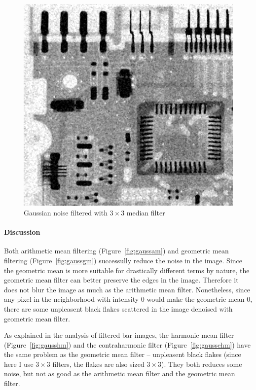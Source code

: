 \documentclass{article}
\begin{document}
\begin{figure}[]
	\centering
	\includegraphics[width=336pt]{../result/task2/gauss/gauss-median.png}
	\caption{Gaussian noise filtered with $3 \times 3$ median filter}
	\label{fig:gaussm}
\end{figure}


\paragraph{Discussion}
Both arithmetic mean filtering (Figure~\ref{fig:gaussam}) and geometric mean filtering (Figure~\ref{fig:gaussgm}) successully reduce the noise in the image. Since the geometric mean is more suitable for drastically different terms by nature, the geometric mean filter can better preserve the edges in the image. Therefore it does not blur the image as much as the arithmetic mean filter. Nonetheless, since any pixel in the neighborhood with intensity $0$ would make the geometric mean $0$, there are some unpleasent black flakes scattered in the image denoised with geometric mean filter.

As explained in the analysis of filtered bar images, the harmonic mean filter (Figure~\ref{fig:gausshm}) and the contraharmonic filter (Figure~\ref{fig:gausschm}) have the same problem as the geometric mean filter -- unpleasent black flakes (since here I use $3 \times 3$ filters, the flakes are also sized $3 \times 3$). They both reduces some noise, but not as good as the arithmetic mean filter and the geometric mean filter.
\end{document}
